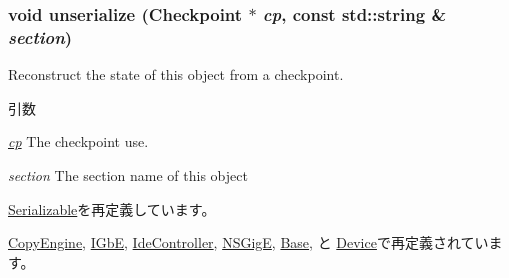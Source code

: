 \hypertarget{classPciDevice_af22e5d6d660b97db37003ac61ac4ee49}{
\subsubsection[{unserialize}]{\setlength{\rightskip}{0pt plus 5cm}void unserialize ({\bf Checkpoint} $\ast$ {\em cp}, \/  const std::string \& {\em section})}}
\label{classPciDevice_af22e5d6d660b97db37003ac61ac4ee49}
Reconstruct the state of this object from a checkpoint. 
\begin{DoxyParams}{引数}
\item[{\em \hyperlink{namespacecp}{cp}}]The checkpoint use. \item[{\em section}]The section name of this object \end{DoxyParams}


\hyperlink{classSerializable_af100c4e9feabf3cd918619c88c718387}{Serializable}を再定義しています。

\hyperlink{classCopyEngine_af22e5d6d660b97db37003ac61ac4ee49}{CopyEngine}, \hyperlink{classIGbE_af22e5d6d660b97db37003ac61ac4ee49}{IGbE}, \hyperlink{classIdeController_af22e5d6d660b97db37003ac61ac4ee49}{IdeController}, \hyperlink{classNSGigE_af22e5d6d660b97db37003ac61ac4ee49}{NSGigE}, \hyperlink{classSinic_1_1Base_af22e5d6d660b97db37003ac61ac4ee49}{Base}, と \hyperlink{classSinic_1_1Device_af22e5d6d660b97db37003ac61ac4ee49}{Device}で再定義されています。


